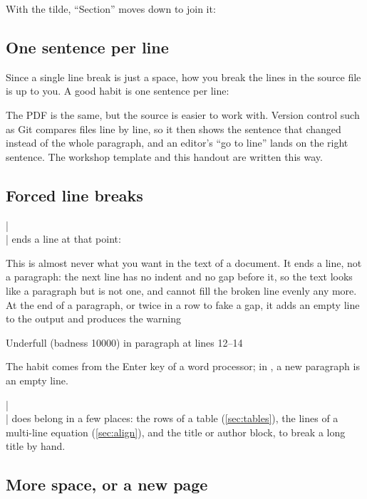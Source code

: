 With the tilde, \enquote{Section} moves down to join it:


\subsection{One sentence per line}

Since a single line break is just a space, how you break the lines in the source file is up to you.
A good habit is one sentence per line:


The PDF is the same, but the source is easier to work with.
Version control such as Git compares files line by line,
so it then shows the sentence that changed instead of the whole paragraph,
and an editor's \enquote{go to line} lands on the right sentence.
The workshop template and this handout are written this way.

\subsection{Forced line breaks}

\code|\\| ends a line at that point:


This is almost never what you want in the text of a document.
It ends a line, not a paragraph:
the next line has no indent and no gap before it,
so the text looks like a paragraph but is not one,
and  cannot fill the broken line evenly any more.
At the end of a paragraph, or twice in a row to fake a gap,
it adds an empty line to the output and produces the warning
\begin{codeblock}[style=shell]
Underfull \hbox (badness 10000) in paragraph at lines 12--14
\end{codeblock}
The habit comes from the Enter key of a word processor; in , a new paragraph is an empty line.

\code|\\| does belong in a few places:
the rows of a table (\autoref{sec:tables}), the lines of a multi-line equation (\autoref{sec:align}),
and the title or author block, to break a long title by hand.

\subsection{More space, or a new page}

